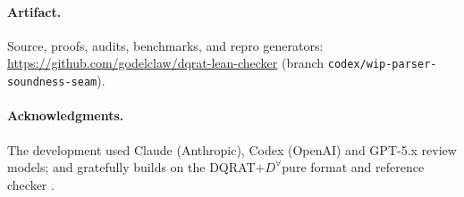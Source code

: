 \documentclass{article}
\begin{document}
\paragraph{Artifact.} Source, proofs, audits, benchmarks, and repro
generators: \url{https://github.com/godelclaw/dqrat-lean-checker}
(branch \texttt{codex/wip-parser-}%
\allowbreak\texttt{soundness-seam}).

\paragraph{Acknowledgments.} The development used Claude (Anthropic), Codex
(OpenAI) and GPT-5.x review models; and gratefully builds on the
DQRAT$+D^{\forall}$pure format and reference checker \cite{dqratcheck}.



\end{document}
